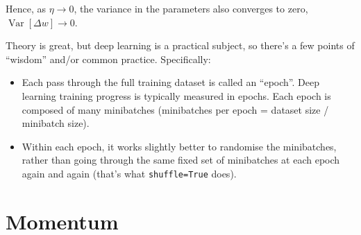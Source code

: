 \documentclass{article}
\newcommand{\bracket}[3]{\left#1 #3 \right#2}
\newcommand{\sqb}{\bracket{[}{]}}
\newcommand{\0}{\mathbf{0}}
\newcommand{\gsfb}{g_\text{fb}}
\newcommand{\gsmb}{g_\text{mb}}
\newcommand{\E}{\operatorname{E}\sqb}
\newcommand{\Var}{\operatorname{Var}\sqb}
\begin{document}
Hence, as $\eta \rightarrow 0$, the variance in the parameters also converges to zero, $\Var{\Delta w} \rightarrow 0$.

Theory is great, but deep learning is a practical subject, so there's a few points of ``wisdom'' and/or common practice. Specifically:
\begin{itemize}
  \item Each pass through the full training dataset is called an ``epoch''.  Deep learning training progress is typically measured in epochs.  Each epoch is composed of many minibatches (minibatches per epoch = dataset size / minibatch size).
  \item Within each epoch, it works slightly better to randomise the minibatches, rather than going through the same fixed set of minibatches at each epoch again and again (that's what \verb|shuffle=True| does).
\end{itemize}

\section{Momentum}
\end{document}
